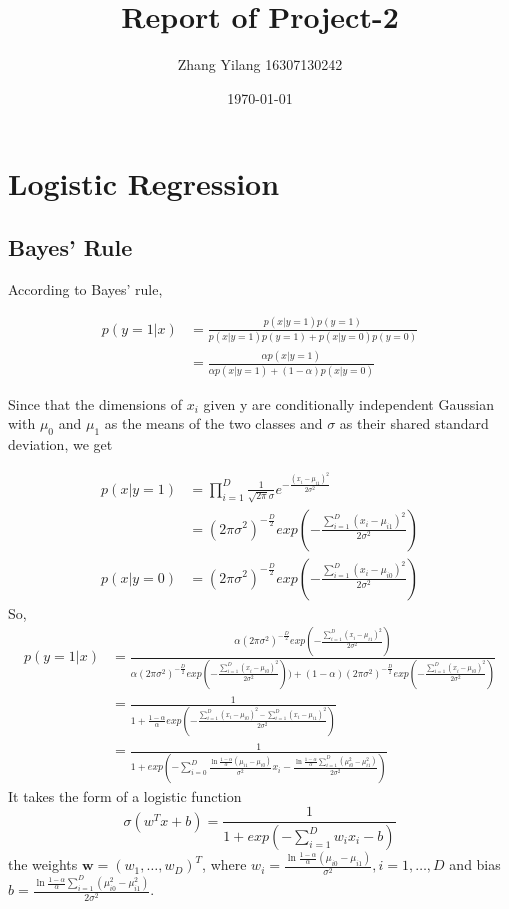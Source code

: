 \documentclass{article}
\title{Report of Project-2} %
\author{Zhang Yilang 16307130242} %
\date{\today} %
\begin{document}
	
\maketitle %


\section{Logistic Regression} %


\subsection{Bayes’ Rule}

  According to Bayes’ rule,

	\[
	\begin{aligned}
	p(y=1|x)&=\frac{p(x|y=1)p(y=1)}{p(x|y=1)p(y=1)+p(x|y=0)p(y=0)} \\
	&=\frac{\alpha p(x|y=1)}{\alpha p(x|y=1)+(1-\alpha)p(x|y=0)}
	\end{aligned}
	\]
	
   Since that the dimensions of 
   $x_i$ given y are conditionally independent Gaussian with $\mu_0$ and $\mu_1$ as the means of the two classes and $\sigma$ as their shared standard deviation, we get
   
 	\[
 	\begin{aligned}
 	p(x|y=1)&=\prod_{i=1}^D\frac{1}{\sqrt{2\pi}\sigma}
 	e^{-\frac{(x_i-\mu_{i1})^2}{2\sigma^2}} \\
 	&=(2\pi\sigma^2)^{-\frac{D}{2}}exp(-\frac{\sum_{i=1}^{D}(x_i-\mu_{i1})^2}{2\sigma^2}) \\
 	p(x|y=0)&=(2\pi\sigma^2)^{-\frac{D}{2}}exp(-\frac{\sum_{i=1}^{D}(x_i-\mu_{i0})^2}{2\sigma^2})	
 	\end{aligned}
 	\]
  So,
 	\[
 	\begin{aligned}
 	p(y=1|x)&=\frac
 	{\alpha(2\pi\sigma^2)^{-\frac{D}{2}}exp(-\frac{\sum_{i=1}^{D}(x_i-\mu_{i1})^2}{2\sigma^2})}
 	{\alpha (2\pi\sigma^2)^{-\frac{D}{2}}exp(-\frac{\sum_{i=1}^{D}(x_i-\mu_{i0})^2}{2\sigma^2}))+(1-\alpha)(2\pi\sigma^2)^{-\frac{D}{2}}exp(-\frac{\sum_{i=1}^{D}(x_i-\mu_{i0})^2}{2\sigma^2})}\\
 	&=\frac{1}{1+\frac{1-\alpha}{\alpha}exp(-\frac{\sum_{i=1}^{D}(x_i-\mu_{i0})^2-\sum_{i=1}^{D}(x_i-\mu_{i1})^2}{2\sigma^2})}\\
 	&=\frac{1}{1+exp(-\sum_{i=0}^{D}\frac{\ln\frac{1-\alpha}{\alpha}(\mu_{i1}-\mu_{i0})}{\sigma^2}x_i-\frac{\ln\frac{1-\alpha}{\alpha}\sum_{i=1}^{D}(\mu_{i0}^2-\mu_{i1}^2)}{2\sigma^2})}
 	\end{aligned}
 	\]
  It takes the form of a logistic function 
 	\[
 	\sigma(w^Tx+b)=\frac{1}{1+exp(-\sum_{i=1}^{D}w_ix_i-b)}
 	\]
  the weights $\bm{w}=(w_1,\dots,w_D)^T$, where $w_i=\frac{\ln\frac{1-\alpha}{\alpha}(\mu_{i0}-\mu_{i1})}{\sigma^2}, i=1,\dots,D$ and bias $b=\frac{\ln\frac{1-\alpha}{\alpha}\sum_{i=1}^{D}(\mu_{i0}^2-\mu_{i1}^2)}{2\sigma^2}$.
 	
\end{document}

